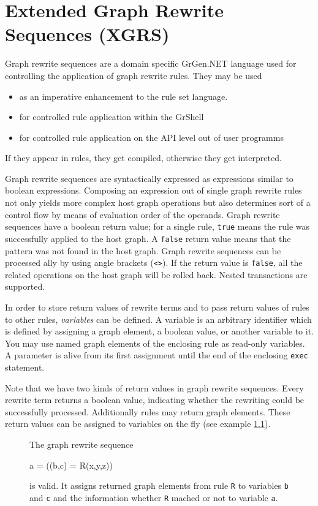 \chapter{Extended Graph Rewrite Sequences (XGRS)}
\label{cha:xgrs}

Graph rewrite sequences are a domain specific GrGen.NET language
used for controlling the application of graph rewrite rules. They may be used
\begin{itemize}
\item as an imperative enhancement to the rule set language.
\item for controlled rule application within the GrShell
\item for controlled rule application on the API level out of user programms
\end{itemize}

If they appear in rules, they get compiled, otherwise they get interpreted.

Graph rewrite sequences are syntactically expressed as expressions similar to boolean expressions.
Composing an expression out of single graph rewrite rules not only yields more complex host graph operations but also determines sort of a control flow by means of evaluation order of the operands.
Graph rewrite sequences have a boolean return value; for a single rule, \texttt{true} means the rule was successfully applied to the host graph.
A \texttt{false} return value means that the pattern was not found in the host graph.
Graph rewrite sequences can be processed ally by using angle brackets (\texttt{<>}).
If the return value is \texttt{false}, all the related operations on the host graph will be rolled back.
Nested transactions are supported.

In order to store return values of rewrite terms and to pass return values of rules to other rules, \emph{variables} can be defined.
A variable is an arbitrary identifier which is defined by assigning a graph element, a boolean value, or another variable to it.
You may use named graph elements of the enclosing rule as read-only variables.
A parameter is alive from its first assignment until the end of the enclosing \texttt{exec} statement.

Note that we have two kinds of return values in graph rewrite sequences.
Every rewrite term returns a boolean value, indicating whether the rewriting could be successfully processed.
Additionally rules may return graph elements.
These return values can be assigned to variables on the fly (see example \ref{ex:grsreturn}).
\begin{figure}[htbp]
\begin{example}
	\label{ex:grsreturn}
	The graph rewrite sequence
	\begin{grgen}	 
a = ((b,c) = R(x,y,z))
	\end{grgen}
	is valid. 
	It assigns returned graph elements from rule \texttt{R} to variables \texttt{b} and \texttt{c} and the information whether \texttt{R} mached or not to variable \texttt{a}.
\end{example}
\end{figure}

